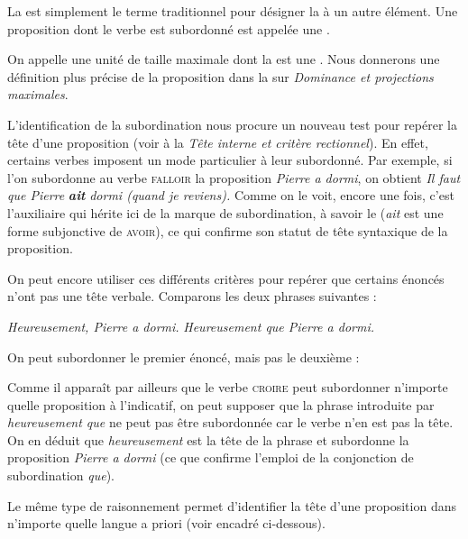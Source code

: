 {La  est simplement le terme traditionnel pour désigner la  à un autre élément.  Une proposition dont le verbe est subordonné est appelée une .}

On appelle  une unité de taille maximale dont la  est une . Nous donnerons une définition plus précise de la proposition dans la  sur \textit{Dominance et projections maximales}.

L’identification de la subordination nous procure un nouveau test pour repérer la tête d’une proposition (voir  à la  \textit{Tête interne et critère rectionnel}). En effet, certains verbes imposent un mode particulier à leur subordonné. Par exemple, si l’on subordonne au verbe \textsc{falloir} la proposition \textit{Pierre a dormi}, on obtient \textit{Il faut que Pierre} \textbf{\textit{ait}} \textit{dormi (quand je reviens).} Comme on le voit, encore une fois, c’est l’auxiliaire qui hérite ici de la marque de subordination, à savoir le  (\textit{ait} est une forme subjonctive de \textsc{avoir}), ce qui confirme son statut de tête syntaxique de la proposition.

On peut encore utiliser ces différents critères pour repérer que certains énoncés n’ont pas une tête verbale. Comparons les deux phrases suivantes :

\ea 
  \ea \textit{Heureusement, Pierre a dormi.}
  \ex \textit{Heureusement que Pierre a dormi.}
  \z
\z

On peut subordonner le premier énoncé, mais pas le deuxième :

\ea
  \z
\z

Comme il apparaît par ailleurs que le verbe \textsc{croire} peut subordonner n’importe quelle proposition à l’indicatif, on peut supposer que la phrase introduite par \textit{heureusement que} ne peut pas être subordonnée car le verbe n’en est pas la tête. On en déduit que \textit{heureusement} est la tête de la phrase et subordonne la proposition \textit{Pierre a dormi} (ce que confirme l’emploi de la conjonction de subordination \textit{que}).

Le même type de raisonnement permet d’identifier la tête d’une proposition dans n’importe quelle langue a priori (voir encadré ci-dessous).


